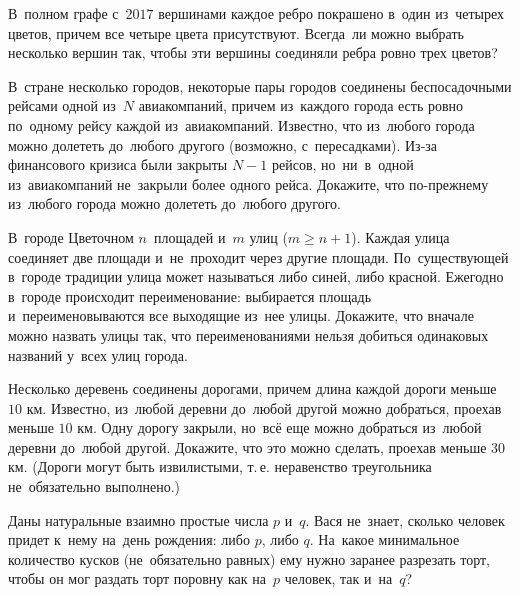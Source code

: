 


\begin{problems}

\item
В~полном графе с~$2017$ вершинами каждое ребро покрашено в~один из~четырех
цветов, причем все четыре цвета присутствуют.
Всегда~ли можно выбрать несколько вершин так, чтобы эти вершины соединяли ребра
ровно трех цветов?

\item
В~стране несколько городов, некоторые пары городов соединены беспосадочными
рейсами одной из~$N$ авиакомпаний, причем из~каждого города есть ровно
по~одному рейсу каждой из~авиакомпаний.
Известно, что из~любого города можно долететь до~любого другого (возможно,
с~пересадками).
Из-за финансового кризиса были закрыты $N - 1$ рейсов, но~ни~в~одной
из~авиакомпаний не~закрыли более одного рейса.
Докажите, что по-прежнему из~любого города можно долететь до~любого другого.

\item
В~городе Цветочном $n$~площадей и~$m$ улиц ($m \geq n + 1$).
Каждая улица соединяет две площади и~не~проходит через другие площади.
По~существующей в~городе традиции улица может называться либо синей, либо
красной.
Ежегодно в~городе происходит переименование:
выбирается площадь и~переименовываются все выходящие из~нее улицы.
Докажите, что вначале можно назвать улицы так, что переименованиями нельзя
добиться одинаковых названий у~всех улиц города.

\item
Несколько деревень соединены дорогами, причем длина каждой дороги меньше
$10$ км.
Известно, из~любой деревни до~любой другой можно добраться, проехав меньше
$10$ км.
Одну дорогу закрыли, но~всё еще можно добраться из~любой деревни до~любой
другой.
Докажите, что это можно сделать, проехав меньше $30$ км.
(Дороги могут быть извилистыми, т.\,е. неравенство треугольника не~обязательно
выполнено.)

\item
Даны натуральные взаимно простые числа $p$ и~$q$.
Вася не~знает, сколько человек придет к~нему на~день рождения:
либо $p$, либо $q$.
На~какое минимальное количество кусков (не~обязательно равных) ему нужно
заранее разрезать торт, чтобы он мог раздать торт поровну как на~$p$ человек,
так и~на~$q$?


\end{problems}
